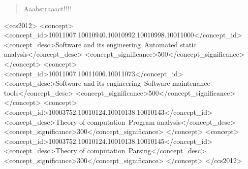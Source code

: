 \documentclass{sig-alternate-05-2015}
\begin{document}
\begin{abstract}

Aaabstraaact!!!!

\end{abstract}

\begin{CCSXML}
<ccs2012>
    <concept>
        <concept_id>10011007.10010940.10010992.10010998.10011000</concept_id>
        <concept_desc>Software and its engineering~Automated static analysis</concept_desc>
        <concept_significance>500</concept_significance>
    </concept>
    <concept>
        <concept_id>10011007.10011006.10011073</concept_id>
        <concept_desc>Software and its engineering~Software maintenance tools</concept_desc>
        <concept_significance>500</concept_significance>
    </concept>
    <concept>
        <concept_id>10003752.10010124.10010138.10010143</concept_id>
        <concept_desc>Theory of computation~Program analysis</concept_desc>
        <concept_significance>300</concept_significance>
    </concept>
    <concept>
        <concept_id>10003752.10010124.10010138.10010145</concept_id>
        <concept_desc>Theory of computation~Parsing</concept_desc>
        <concept_significance>300</concept_significance>
    </concept>
</ccs2012>
\end{CCSXML}


\printccsdesc











\balancecolumns
\end{document}
